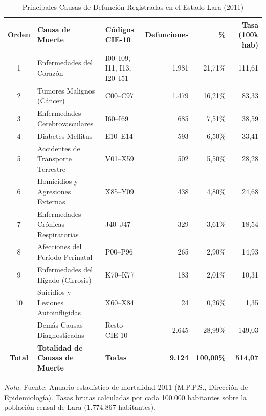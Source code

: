 \documentclass[12pt,letterpaper]{article}
\begin{document}
\begin{table}[htbp]
    \centering
    \caption{Principales Causas de Defunción Registradas en el Estado Lara (2011)}
    \label{tab:causas}
    \footnotesize
    \begin{tabularx}{\textwidth}{c>{\raggedright\arraybackslash}Xp{3.6cm}rrr}
        \toprule
        \textbf{Orden} & \textbf{Causa de Muerte} & \textbf{Códigos CIE-10} & \textbf{Defunciones} & \textbf{\%} & \textbf{Tasa (100k hab)} \\
        \midrule
        1 & Enfermedades del Corazón & I00--I09, I11, I13, I20--I51 & 1.981 & 21,71\% & 111,61 \\
        2 & Tumores Malignos (Cáncer) & C00--C97 & 1.479 & 16,21\% & 83,33 \\
        3 & Enfermedades Cerebrovasculares & I60--I69 & 685 & 7,51\% & 38,59 \\
        4 & Diabetes Mellitus & E10--E14 & 593 & 6,50\% & 33,41 \\
        5 & Accidentes de Transporte Terrestre & V01--X59 & 502 & 5,50\% & 28,28 \\
        6 & Homicidios y Agresiones Externas & X85--Y09 & 438 & 4,80\% & 24,68 \\
        7 & Enfermedades Crónicas Respiratorias & J40--J47 & 329 & 3,61\% & 18,54 \\
        8 & Afecciones del Período Perinatal & P00--P96 & 265 & 2,90\% & 14,93 \\
        9 & Enfermedades del Hígado (Cirrosis) & K70--K77 & 183 & 2,01\% & 10,31 \\
        10 & Suicidios y Lesiones Autoinfligidas & X60--X84 & 24 & 0,26\% & 1,35 \\
        \midrule
        -- & Demás Causas Diagnosticadas & Resto CIE-10 & 2.645 & 28,99\% & 149,03 \\
        \midrule
        \textbf{Total} & \textbf{Totalidad de Causas de Muerte} & \textbf{Todas} & \textbf{9.124} & \textbf{100,00\%} & \textbf{514,07} \\
        \bottomrule
    \end{tabularx}
    \par\vspace{2pt}\noindent\raggedright \small \textit{Nota.} Fuente: Anuario estadístico de mortalidad 2011 (M.P.P.S., Dirección de Epidemiología). Tasas brutas calculadas por cada 100.000 habitantes sobre la población censal de Lara ($1.774.867$ habitantes).
\end{table}
\end{document}
